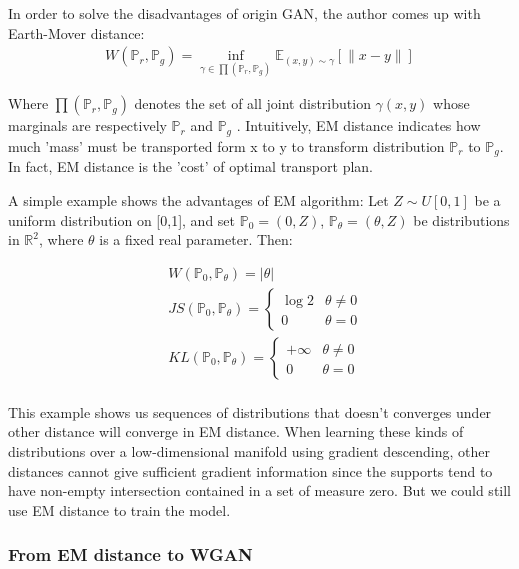 In order to solve the disadvantages of origin GAN, the author comes up with Earth-Mover distance:
\begin{equation}
\begin{aligned}
W(\mathbb{P}_r,\mathbb{P}_g) = \inf \limits_{\gamma \in \prod(\mathbb{P}_r,\mathbb{P}_g)} \mathbb{E}_{(x,y)\sim \gamma}[\|x-y\|]
\end{aligned}
\end{equation}

Where $\prod(\mathbb{P}_r,\mathbb{P}_g)$ denotes the set of all joint distribution $\gamma(x,y)$ whose marginals are respectively $\mathbb{P}_r$ and $\mathbb{P}_g$ . Intuitively, EM distance indicates how much 'mass' must be transported form x to y to transform distribution $\mathbb{P}_r$ to $\mathbb{P}_g$. In fact, EM distance is the 'cost' of optimal transport plan.

A simple example shows the advantages of EM algorithm: Let $Z \sim U[0,1]$ be a uniform distribution on [0,1], and set $\mathbb{P}_0 = (0,Z)$, $\mathbb{P}_\theta=(\theta,Z)$ be distributions in $\mathbb{R}^2$, where $\theta$ is a fixed real parameter. Then:

\begin{equation}
\begin{aligned}
&W(\mathbb{P}_0,\mathbb{P}_\theta) = |\theta|\\
&JS(\mathbb{P}_0,\mathbb{P}_\theta) = 
\begin{cases}
\log 2& \text{$\theta \neq 0$}\\
0& \text{$\theta=0$}
\end{cases}\\
&KL(\mathbb{P}_0,\mathbb{P}_\theta) = 
\begin{cases}
+\infty & \text{$\theta\neq 0$}\\
0 & \text{$\theta=0$}
\end{cases}\\
\end{aligned}
\end{equation}

This example shows us sequences of distributions that doesn't converges under other distance will converge in EM distance. When learning these kinds of distributions over a low-dimensional manifold using gradient descending, other distances cannot give sufficient gradient information since the supports tend to have non-empty intersection contained in a set of measure zero. But we could still use EM distance to train the model.

\subsubsection{From EM distance to WGAN}

